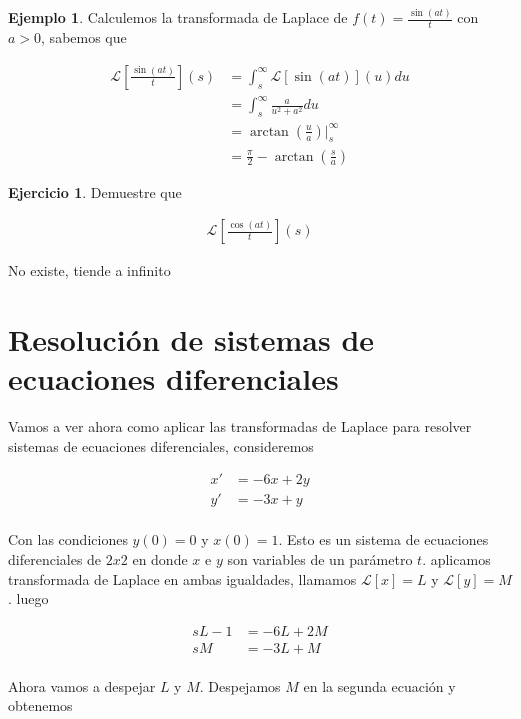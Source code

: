 \documentclass{article}
\theoremstyle{plain}
\theoremstyle{definition}
\newtheorem{ejem}[thm]{Ejemplo}
\newtheorem{ejer}[thm]{Ejercicio}
\begin{document}
\begin{ejem}Calculemos la transformada de Laplace de $f(t) =\displaystyle \frac{\sin(at)}{t}$ con $a>0$, sabemos que
\end{ejem}


\begin{align*}
    \mathcal{L}\left[ \frac{\sin(at)}{t}\right](s) &= \int_s^\infty \mathcal{L}[\sin(at)] (u) du \\
    &= \int_s^\infty \frac{a}{u^2+a^2}  du \\
    &= \arctan \left( \frac{u}{a}\right) \bigg|_s^\infty \\
    &= \frac{\pi}{2}-\arctan\left( \frac{s}{a}\right)
\end{align*}

\begin{ejer}Demuestre que
\end{ejer}

\begin{align*}
    \mathcal{L}\left[ \frac{\cos(at)}{t}\right](s)
\end{align*}

No existe, tiende a infinito


\newpage



\section{Resolución de sistemas de ecuaciones diferenciales}

Vamos a ver ahora como aplicar las transformadas de Laplace para resolver sistemas de ecuaciones diferenciales, consideremos

\begin{align*}
   x' &= -6x+2y \\
    y' &= -3x+y \\
\end{align*}

Con las condiciones $y(0)=0$ y $x(0)=1$. Esto es un sistema de ecuaciones diferenciales de $2x2$ en donde $x$ e $y$ son variables de un parámetro $t$. aplicamos transformada de Laplace en ambas igualdades, llamamos $\mathcal{L}[x]=L$ y $\mathcal{L}[y]=M$. luego


\begin{align*}
   sL-1 &= -6L+2M \\
    sM &= -3L+M \\
\end{align*}

Ahora vamos a despejar $L$ y $M$. Despejamos $M$ en la segunda ecuación y obtenemos
\end{document}
